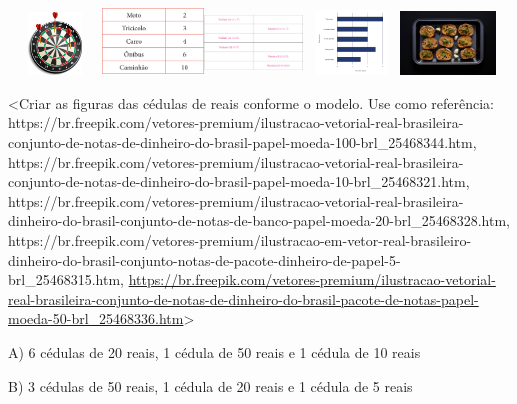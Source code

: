 \includegraphics[width=0.98131in,height=0.65625in]{media/image108.png}\includegraphics[width=1.06299in,height=0.71087in]{media/image157.png}\includegraphics[width=1.02736in,height=0.68704in]{media/image110.png}\includegraphics[width=1.01480in,height=0.67865in]{media/image158.png}\includegraphics[width=0.99484in,height=0.66530in]{media/image159.png}

\textless{}Criar as figuras das cédulas de reais conforme o modelo. Use
como referência:
https://br.freepik.com/vetores-premium/ilustracao-vetorial-real-brasileira-conjunto-de-notas-de-dinheiro-do-brasil-papel-moeda-100-brl\_25468344.htm,
https://br.freepik.com/vetores-premium/ilustracao-vetorial-real-brasileira-conjunto-de-notas-de-dinheiro-do-brasil-papel-moeda-10-brl\_25468321.htm,
https://br.freepik.com/vetores-premium/ilustracao-vetorial-real-brasileira-dinheiro-do-brasil-conjunto-de-notas-de-banco-papel-moeda-20-brl\_25468328.htm,
https://br.freepik.com/vetores-premium/ilustracao-em-vetor-real-brasileiro-dinheiro-do-brasil-conjunto-notas-de-pacote-dinheiro-de-papel-5-brl\_25468315.htm,
\url{https://br.freepik.com/vetores-premium/ilustracao-vetorial-real-brasileira-conjunto-de-notas-de-dinheiro-do-brasil-pacote-de-notas-papel-moeda-50-brl_25468336.htm}\textgreater{}

A) 6 cédulas de 20 reais, 1 cédula de 50 reais e 1 cédula de 10 reais

B) 3 cédulas de 50 reais, 1 cédula de 20 reais e 1 cédula de 5 reais

